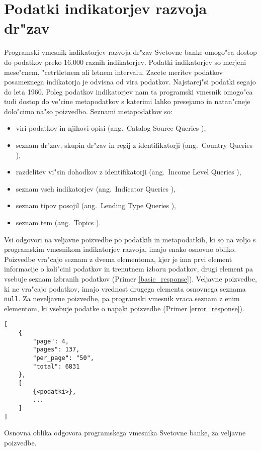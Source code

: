 \section{Podatki indikatorjev razvoja dr"zav}



Programski vmesnik indikatorjev razvoja dr"zav Svetovne banke omogo"ca dostop
do podatkov preko 16.000 raznih indikatorjev. Podatki indikatorjev so merjeni
mese"cnem, "cetrtletnem ali letnem intervalu. Zacete meritev podatkov
posameznega indikatorja je odvisna od vira podatkov. Najstarej"si podatki segajo
do leta 1960. Poleg podatkov indikatorjev nam ta programski vmesnik omogo"ca tudi dostop do ve"cine
metapodatkov s katerimi lahko presejamo in natan"cneje dolo"cimo na"so poizvedbo.
Seznami metapodatkov so:
\begin{itemize}
\item viri podatkov in njihovi opisi (ang.\ Catalog Source Queries
	),
\item seznam dr"zav, skupin dr"zav in regij z identifikatorji (ang.\ Country Queries
	),
\item razdelitev vi"sin dohodkov z identifikatorji (ang.\ Income Level Queries
	),
\item seznam vseh indikatorjev (ang.\ Indicator Queries
  ),
\item seznam tipov posojil (ang.\ Lending Type Queries
	),
\item seznam tem (ang.\ Topics ).
\end{itemize}


Vsi odgovori na veljavne poizvedbe po podatkih in metapodatkih, ki so na voljo
s programskim vmesnikom indikatorjev razvoja, imajo enako osnovno obliko. 
Poizvedbe vra"cajo seznam z dvema elementoma, kjer je ima prvi element 
informacije o koli"cini podatkov in trenutnem izboru podatkov, drugi element 
pa vsebuje seznam izbranih podatkov (Primer \ref{basic_response}). 
Veljavne poizvedbe, ki ne vra"cajo podatkov, imajo vrednost drugega elementa
osnovnega seznama \verb|null|.
Za neveljavne poizvedbe, pa programski vmesnik vraca seznam z enim elementom,
ki vsebuje podatke o napaki poizvedbe (Primer \ref{error_response}).


\begin{snippet}
\begin{center}
\begin{lstlisting}
[
    {
        "page": 4,
        "pages": 137,
        "per_page": "50",
        "total": 6831
    },
    [
        {<podatki>},
        ...
    ]
]
\end{lstlisting}
\end{center}
\caption{Osnovna oblika odgovora programskega vmesnika Svetovne banke, za
veljavne poizvedbe.}
\label{basic_response}
\end{snippet} 


